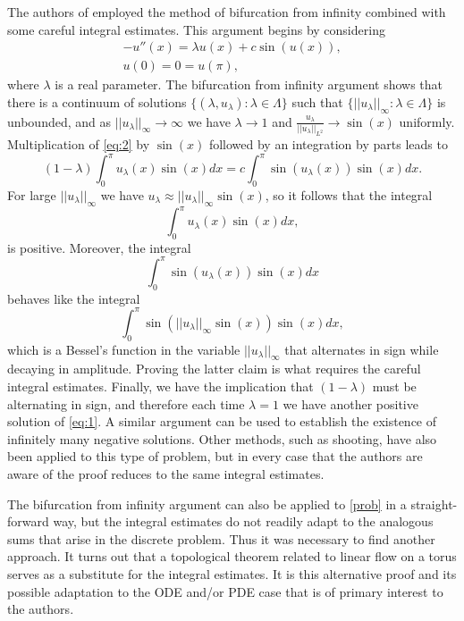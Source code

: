 \documentclass[twoside]{article}
\begin{document}
The authors of \cite{RS} employed the method of bifurcation from infinity combined with some careful integral estimates. This argument begins by considering
\begin{equation}
\label{eq:2}
\begin{array}{c} -u''(x)=\lambda u(x)+c \sin(u(x)), \\ u(0)=0=u(\pi),\end{array}
\end{equation}
where $\lambda$ is a real parameter. The bifurcation from infinity argument shows that there is a continuum of solutions $\{(\lambda,u_{\lambda}):\lambda\in\Lambda\}$ such that $\{||u_{\lambda}||_{\infty}:\lambda\in\Lambda\}$ is unbounded, and as $||u_{\lambda}||_{\infty}\rightarrow\infty$ we have $\lambda\rightarrow 1$ and $\frac{u_{\lambda}}{||u_{\lambda}||_{L^2}}\rightarrow \sin(x)$ uniformly. Multiplication of \eqref{eq:2} by $\sin (x)$ followed by an integration by parts leads to
\[
(1-\lambda)\int_0^{\pi}u_{\lambda}(x)\sin(x)dx=c\int_0^{\pi}\sin(u_{\lambda}(x))\sin(x)dx.
\]
For large $||u_{\lambda}||_{\infty}$ we have $u_\lambda\approx ||u_{\lambda}||_{\infty}\sin(x)$, so it follows that the integral
\[
\int_0^{\pi}u_{\lambda}(x)\sin(x)dx,
\]
is positive. Moreover, the integral
\[
\int_0^{\pi}\sin(u_{\lambda}(x))\sin(x)dx
\]
behaves like the integral
\[
\int_0^{\pi}\sin(||u_{\lambda}||_{\infty}\sin(x))\sin(x)dx,
\]
which is a Bessel's function in the variable $||u_{\lambda}||_{\infty}$ that alternates in sign while decaying in amplitude. Proving the latter claim is what requires the careful integral estimates. Finally, we have the implication that $(1-\lambda)$ must be alternating in sign, and therefore each time $\lambda=1$ we have another positive solution of \eqref{eq:1}. A similar argument can be used to establish the existence of infinitely many negative solutions. Other methods, such as shooting, have also been applied to this type of problem, but in every case that the authors are aware of the proof reduces to the same integral estimates.

The bifurcation from infinity argument can also be applied to \eqref{prob} in a straight-forward way, but the integral estimates do not readily adapt to the analogous sums that arise in the discrete problem. Thus it was necessary to find another approach.  It turns out that a topological theorem related to linear flow on a torus serves as a substitute for the integral estimates. It is this alternative proof and its possible adaptation to the ODE and/or PDE case that is of primary interest to the authors.
\end{document}
